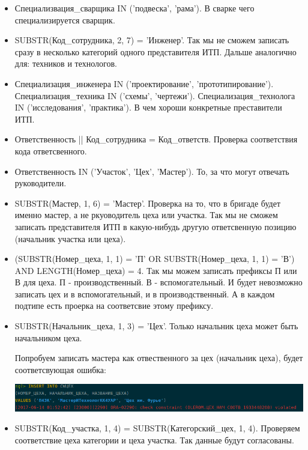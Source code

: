 \begin{itemize}
    \item Специализвация\_сварщика IN ('подвеска', 'рама').
    В сварке чего специализируется сварщик.

    \item SUBSTR(Код\_сотрудника, 2, 7) = 'Инженер'.
    Так мы не сможем записать сразу в несколько категорий одного представителя ИТП.
    Дальше аналогично для: техников и технологов.

    \item Специализация\_инженера IN ('проектирование', 'прототипирование').
    Специализация\_техника IN ('схемы', 'чертежи').
    Специализация\_технолога IN ('исследования', 'практика').
    В чем хороши конкретные преставители ИТП.

    \item Ответственность || Код\_сотрудника = Код\_ответств.
    Проверка соответствия кода ответсвенного.

    \item Ответственность IN ('Участок', 'Цех', 'Мастер').
    То, за что могут отвечать руководители.

    \item SUBSTR(Мастер, 1, 6) = 'Мастер'.
    Проверка на то, что в бригаде будет именно мастер, а не ркуоводитель цеха или участка.
    Так мы не сможем записать представителя ИТП в какую-нибудь другую ответсвенную позицию (начальник участка или цеха).

    \item (SUBSTR(Номер\_цеха, 1, 1) = 'П' OR SUBSTR(Номер\_цеха, 1, 1) = 'В') AND LENGTH(Номер\_цеха) = 4.
    Так мы можем записать префиксы П или В для цеха.
    П - производственный.
    В - вспомогательный.
    И будет невозможно записать цех и в вспомогательный, и в производственный. А в каждом подтипе есть проерка на соответсвие этому префиксу.

    \item SUBSTR(Начальник\_цеха, 1, 3) = 'Цех'.
    Только начальник цеха может быть начальником цеха.

    Попробуем записать мастера как отвественного за цех (начальник цеха), будет соответсвующая ошибка:

    \includegraphics[width=17cm]{./screenshots/constraints/manufactory.png}

    \item SUBSTR(Код\_участка, 1, 4) = SUBSTR(Категорский\_цех, 1, 4).
    Проверяем соответствие цеха категории и цеха участка. Так данные будут согласованы.


\end{itemize}
